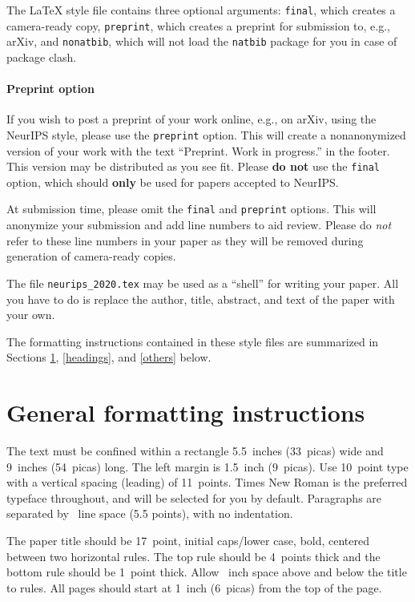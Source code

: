 \documentclass{article}
\begin{document}
The \LaTeX{} style file contains three optional arguments: \verb+final+, which
creates a camera-ready copy, \verb+preprint+, which creates a preprint for
submission to, e.g., arXiv, and \verb+nonatbib+, which will not load the
\verb+natbib+ package for you in case of package clash.

\paragraph{Preprint option}
If you wish to post a preprint of your work online, e.g., on arXiv, using the
NeurIPS style, please use the \verb+preprint+ option. This will create a
nonanonymized version of your work with the text ``Preprint. Work in progress.''
in the footer. This version may be distributed as you see fit. Please \textbf{do
  not} use the \verb+final+ option, which should \textbf{only} be used for
papers accepted to NeurIPS.

At submission time, please omit the \verb+final+ and \verb+preprint+
options. This will anonymize your submission and add line numbers to aid
review. Please do \emph{not} refer to these line numbers in your paper as they
will be removed during generation of camera-ready copies.

The file \verb+neurips_2020.tex+ may be used as a ``shell'' for writing your
paper. All you have to do is replace the author, title, abstract, and text of
the paper with your own.

The formatting instructions contained in these style files are summarized in
Sections \ref{gen_inst}, \ref{headings}, and \ref{others} below.

\section{General formatting instructions}
\label{gen_inst}

The text must be confined within a rectangle 5.5~inches (33~picas) wide and
9~inches (54~picas) long. The left margin is 1.5~inch (9~picas).  Use 10~point
type with a vertical spacing (leading) of 11~points.  Times New Roman is the
preferred typeface throughout, and will be selected for you by default.
Paragraphs are separated by ~line space (5.5 points), with no
indentation.

The paper title should be 17~point, initial caps/lower case, bold, centered
between two horizontal rules. The top rule should be 4~points thick and the
bottom rule should be 1~point thick. Allow ~inch space above and
below the title to rules. All pages should start at 1~inch (6~picas) from the
top of the page.
\end{document}
